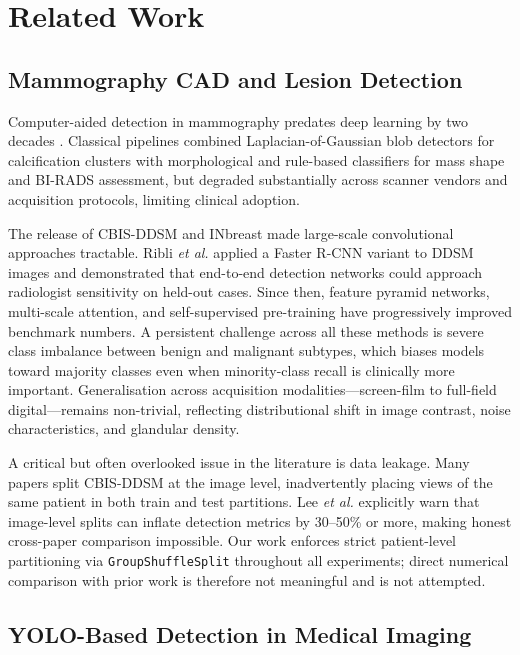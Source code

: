 \documentclass[runningheads]{llncs}
\begin{document}
\section{Related Work}
\label{sec:related}

\subsection{Mammography CAD and Lesion Detection}

Computer-aided detection in mammography predates deep learning by two
decades \cite{doi2007computer}. Classical pipelines combined
Laplacian-of-Gaussian blob detectors for calcification clusters with
morphological and rule-based classifiers for mass shape and BI-RADS
assessment, but degraded substantially across scanner vendors and
acquisition protocols, limiting clinical adoption.

The release of CBIS-DDSM \cite{lee2017curated} and INbreast
\cite{moreira2012inbreast} made large-scale convolutional approaches
tractable. Ribli \textit{et al.} \cite{ribli2018detecting} applied a
Faster R-CNN variant to DDSM images and demonstrated that end-to-end
detection networks could approach radiologist sensitivity on held-out
cases. Since then, feature pyramid networks, multi-scale attention, and
self-supervised pre-training have progressively improved benchmark
numbers. A persistent challenge across all these methods is severe class
imbalance between benign and malignant subtypes, which biases models
toward majority classes even when minority-class recall is clinically
more important. Generalisation across acquisition modalities---screen-film
to full-field digital---remains non-trivial, reflecting distributional
shift in image contrast, noise characteristics, and glandular density.

A critical but often overlooked issue in the literature is data leakage.
Many papers split CBIS-DDSM at the image level, inadvertently placing
views of the same patient in both train and test partitions. Lee
\textit{et al.} \cite{lee2017curated} explicitly warn that image-level
splits can inflate detection metrics by 30--50\% or more, making honest
cross-paper comparison impossible. Our work enforces strict patient-level
partitioning via \texttt{GroupShuffleSplit} throughout all experiments;
direct numerical comparison with prior work is therefore not meaningful
and is not attempted.

\subsection{YOLO-Based Detection in Medical Imaging}
\end{document}
